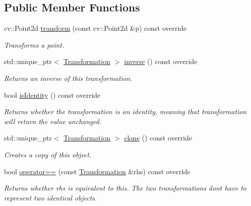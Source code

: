 \subsection*{Public Member Functions}
\begin{DoxyCompactItemize}
\item 
cv\+::\+Point2d \hyperlink{structdg_1_1deepcore_1_1geometry_1_1_identity_transformation_a9a095f1b9da9c078faf2b291a1d3019d}{transform} (const cv\+::\+Point2d \&p) const override
\begin{DoxyCompactList}\small\item\em Transforms a point. \end{DoxyCompactList}\item 
std\+::unique\+\_\+ptr$<$ \hyperlink{structdg_1_1deepcore_1_1geometry_1_1_transformation}{Transformation} $>$ \hyperlink{structdg_1_1deepcore_1_1geometry_1_1_identity_transformation_ad823ed13d450a823416b221671412912}{inverse} () const override
\begin{DoxyCompactList}\small\item\em Returns an inverse of this transformation. \end{DoxyCompactList}\item 
bool \hyperlink{structdg_1_1deepcore_1_1geometry_1_1_identity_transformation_abfa0af70a5b3cf481e8b90aea03a32d7}{is\+Identity} () const override
\begin{DoxyCompactList}\small\item\em Returns whether the transformation is an identity, meaning that transformation will return the value unchanged. \end{DoxyCompactList}\item 
std\+::unique\+\_\+ptr$<$ \hyperlink{structdg_1_1deepcore_1_1geometry_1_1_transformation}{Transformation} $>$ \hyperlink{structdg_1_1deepcore_1_1geometry_1_1_identity_transformation_ad365e42292c0d72750aa7dd87a3a4bcc}{clone} () const override
\begin{DoxyCompactList}\small\item\em Creates a copy of this object. \end{DoxyCompactList}\item 
bool \hyperlink{structdg_1_1deepcore_1_1geometry_1_1_identity_transformation_a926efdf8f7937e4583a9c4d734a52816}{operator==} (const \hyperlink{structdg_1_1deepcore_1_1geometry_1_1_transformation}{Transformation} \&rhs) const override
\begin{DoxyCompactList}\small\item\em Returns whether {\ttfamily rhs} is equivalent to this. The two transformations don\textquotesingle{}t have to represent two identical objects. \end{DoxyCompactList}\item 

\end{DoxyCompactItemize}
